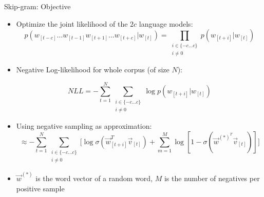 \documentclass[11pt,compress,t,notes=noshow, xcolor=table]{beamer}
\begin{document}
\begin{vbframe}{Skip-gram: Objective}

\vfill

\footnotesize
\begin{itemize}
	\item Optimize the joint likelihood of the $2c$ language models:
	$$p (w_{[t-c]} \dots w_{[t-1]} w_{[t+1]} \dots w_{[t+c]}|w_{[t]}) = \prod_{\substack{i \in  \{-c \ldots c\}\\ i \neq 0}} p(w_{[t+i]}|w_{[t]})$$
	
	\item Negative Log-likelihood for whole corpus (of size $N$):
	
	$$NLL = - \sum_{t=1}^N \sum_{\substack{i \in  \{-c \ldots c\}\\ i \neq 0}} \log p (w_{[t+i]}|w_{[t]})$$

	\item Using negative sampling as approximation:
		$$\approx - \sum_{t=1}^N \sum_{\substack{i \in  \{-c \ldots c\}\\ i \neq 0}} \Big[ \log \sigma(\vec w_{[t+i]}^T \vec v_{[t]}) + \sum_{m=1}^{M} \log [1-\sigma(\vec w^{{(*)}^T} \vec v_{[t]})]\Big] $$
	\item $\vec w^{(*)}$ is the word vector of a random word, $M$ is the number of negatives per positive sample
\end{itemize}

\vfill

\end{vbframe}

\end{document}
